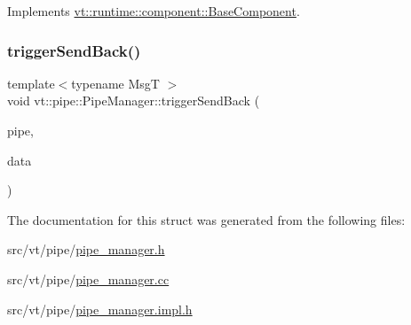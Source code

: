 Implements \hyperlink{structvt_1_1runtime_1_1component_1_1_base_component_a7701485f3539f78d42e6bad47fc7eb78}{vt\+::runtime\+::component\+::\+Base\+Component}.

\mbox{\label{structvt_1_1pipe_1_1_pipe_manager_aaddd05d4eec8fbcbe8134f9c907a7306}} 
\subsubsection{\texorpdfstring{trigger\+Send\+Back()}{triggerSendBack()}}
{\footnotesize\ttfamily template$<$typename MsgT $>$ \\
void vt\+::pipe\+::\+Pipe\+Manager\+::trigger\+Send\+Back (\begin{DoxyParamCaption}\item[{\hyperlink{namespacevt_ac9852acda74d1896f48f406cd72c7bd3}{Pipe\+Type} const \&}]{pipe,  }\item[{MsgT $\ast$}]{data }\end{DoxyParamCaption})}



The documentation for this struct was generated from the following files\+:\begin{DoxyCompactItemize}
\item 
src/vt/pipe/\hyperlink{pipe__manager_8h}{pipe\+\_\+manager.\+h}\item 
src/vt/pipe/\hyperlink{pipe__manager_8cc}{pipe\+\_\+manager.\+cc}\item 
src/vt/pipe/\hyperlink{pipe__manager_8impl_8h}{pipe\+\_\+manager.\+impl.\+h}\end{DoxyCompactItemize}
